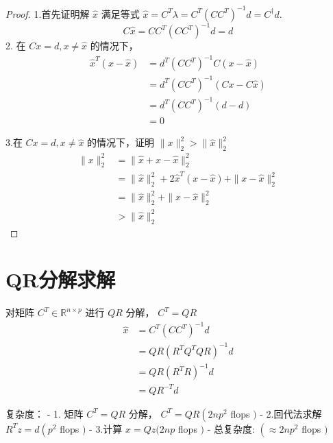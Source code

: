\begin{proof}
    1.首先证明解 $ \hat{x} $ 满足等式 $ \hat{x}=C^{T} \lambda=C^{T}\left(C C^{T}\right)^{-1} d=C^{\dagger} d $.
$$
C \hat{x}=C C^{T}\left(C C^{T}\right)^{-1} d=d
$$
2. 在 $ C x=d, x \neq \hat{x} $ 的情况下，
$$
\begin{aligned}
\hat{x}^{T}(x-\hat{x}) &=d^{T}\left(C C^{T}\right)^{-1} C(x-\hat{x}) \\
&=d^{T}\left(C C^{T}\right)^{-1}(C x-C \hat{x}) \\
&=d^{T}\left(C C^{T}\right)^{-1}(d-d) \\
&=0
\end{aligned}
$$

3.在 $ C x=d, x \neq \hat{x} $ 的情况下，证明 $ \|x\|_{2}^{2}>\|\hat{x}\|_{2}^{2} $
$$
\begin{aligned}
\|x\|_{2}^{2} &=\|\hat{x}+x-\hat{x}\|_{2}^{2} \\
&=\|\hat{x}\|_{2}^{2}+2 \hat{x}^{T}(x-\hat{x})+\|x-\hat{x}\|_{2}^{2} \\
&=\|\hat{x}\|_{2}^{2}+\|x-\hat{x}\|_{2}^{2} \\
&>\|\hat{x}\|_{2}^{2}
\end{aligned}
$$
\end{proof}

\section{QR分解求解}

对矩阵 $ C^{T} \in \mathbb{R}^{n \times p} $ 进行 $ Q R $ 分解， $ C^{T}=Q R $
$$
\begin{aligned}
\hat{x} &=C^{T}\left(C C^{T}\right)^{-1} d \\
&=Q R\left(R^{T} Q^{T} Q R\right)^{-1} d \\
&=Q R\left(R^{T} R\right)^{-1} d \\
&=Q R^{-T} d
\end{aligned}
$$

复杂度：
- 1. 矩阵 $ C^{T}=Q R $ 分解， $ C^{T}=Q R\left(2 n p^{2}\right. $ flops $ ) $
- 2.回代法求解 $ R^{T} z=d\left(p^{2}\right. $ flops $ ) $
- 3.计算 $ \hat{x}=Q z(2 n p $ flops $ ) $
- 总复杂度: $ \left(\approx 2 n p^{2}\right. $ flops $ ) $

